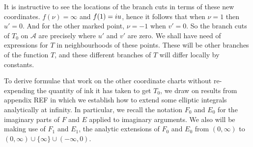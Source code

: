It is instructive to see the locations of the branch cuts in terms of these new coordinates. $f(ν) = ∞$ and $f(1) = i u$, hence it follows that when $ν=1$ then $u' = 0$. And for the other marked point, $ν=-1$ when $v'=0$. So the branch cuts of $T_0$ on $\mathcal{A}$ are precisely where $u'$ and $v'$ are zero. We shall have need of expressions for $T$ in neighbourhoods of these points. These will be other branches of the function $T$, and these different branches of $T$ will differ locally by constants.

To derive formulae that work on the other coordinate charts without re-expending the quantity of ink it has taken to get $T_0$, we draw on results from appendix REF  in which we establish how to extend some elliptic integrals analytically at infinity. In particular, we recall the notation $F_0$ and $E_0$ for the imaginary parts of $F$ and $E$ applied to imaginary arguments. We also will be making use of $F_1$ and $E_1$, the analytic extensions of $F_0$ and $E_0$ from $(0,\infty)$ to $(0,\infty)\cup \{\infty\} \cup (-\infty, 0)$.


